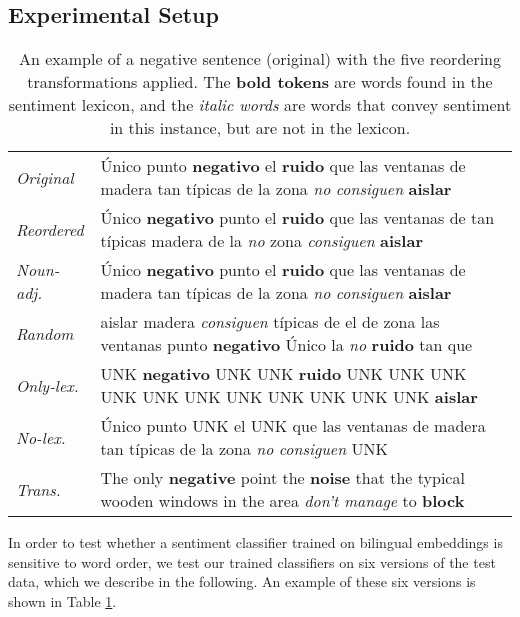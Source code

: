 \documentclass[11pt,a4paper]{article}
\begin{document}
\subsection{Experimental Setup}

\begin{table*}[]
\centering\small
\newcommand{\lex}[1]{{\setlength{\fboxsep}{1pt}\colorbox{lightred}{\textbf{#1}}}}
\newcommand{\nonlex}[1]{{\setlength{\fboxsep}{1pt}\colorbox{lighterred}{\textit{#1}}}}
\begin{tabular}{ll}
\toprule
\emph{Original} & Único punto \lex{negativo} el \lex{ruido} que las ventanas de madera tan típicas de la zona \nonlex{no} \nonlex{consiguen} \lex{aislar} \\[3pt]
\emph{Reordered} & Único \lex{negativo} punto el \lex{ruido} que las ventanas de tan típicas madera de la \nonlex{no} zona \nonlex{consiguen} \lex{aislar} \\[3pt]
\emph{Noun-adj.} & Único \lex{negativo} punto el \lex{ruido} que las ventanas de madera tan típicas de la zona \nonlex{no} \nonlex{consiguen} \lex{aislar} \\[3pt]
\emph{Random} & aislar madera \nonlex{consiguen} típicas de el de zona las ventanas punto \lex{negativo} Único la \nonlex{no} \lex{ruido} tan que\\[3pt]
\emph{Only-lex.} & UNK \lex{negativo} UNK UNK \lex{ruido} UNK UNK UNK UNK UNK UNK UNK UNK UNK UNK UNK  \lex{aislar}\\[3pt]
\emph{No-lex.} & Único punto UNK el UNK que las ventanas de madera tan típicas de la zona \nonlex{no} \nonlex{consiguen} UNK \\[3pt]
\cmidrule(lr){0-1}
\emph{Trans.} & The only \lex{negative} point the \lex{noise} that the typical wooden windows in the area \nonlex{don't manage} to \lex{block} \\[3pt]
\bottomrule
\end{tabular}
\caption{An example of a negative sentence (original) with the five reordering
transformations applied. The \lex{bold tokens} are words found in the sentiment lexicon, and the \nonlex{italic words} are words that convey sentiment in this instance, but are not in the lexicon.}
\label{example}

\end{table*}

In order to test whether a sentiment classifier trained on bilingual embeddings is sensitive to word order, we test our trained classifiers on six versions of the test
data, which we describe in the following. An example of these six versions is shown in Table \ref{example}.
\end{document}
